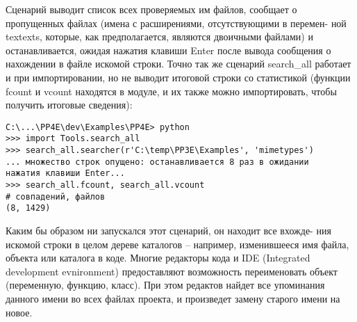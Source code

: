 \documentclass[12pt]{article}
\begin{document}
Сценарий выводит список всех проверяемых им файлов, сообщает о пропущенных файлах (имена с расширениями, отсутствующими в перемен-
ной textexts, которые, как предполагается, являются двоичными файлами) и останавливается, ожидая нажатия клавиши Enter после вывода
сообщения о нахождении в файле искомой строки. Точно так же сценарий search\_all работает и при импортировании, но не выводит итоговой
строки со статистикой (функции fcount и vcount находятся в модуле, и их
также можно импортировать, чтобы получить итоговые сведения):
\begin{verbatim}
C:\...\PP4E\dev\Examples\PP4E> python
>>> import Tools.search_all
>>> search_all.searcher(r'C:\temp\PP3E\Examples', 'mimetypes')
... множество строк опущено: останавливается 8 раз в ожидании
нажатия клавиши Enter...
>>> search_all.fcount, search_all.vcount
# совпадений, файлов
(8, 1429)
\end{verbatim}
Каким бы образом ни запускался этот сценарий, он находит все вхожде-
ния искомой строки в целом дереве каталогов – например, изменившееся
имя файла, объекта или каталога в коде. Многие редакторы кода и IDE (Integrated development evnironment) предоставляют возможность переименовать объект (переменную, функцию, класс). При этом редактов найдет все упоминания данного имени во всех файлах проекта, и произведет замену старого имени на новое. 
\end{document}
